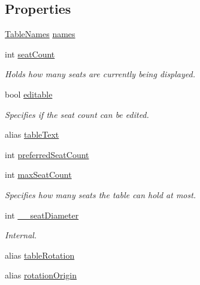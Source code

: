 \subsection*{Properties}
\begin{DoxyCompactItemize}
\item 
\hyperlink{classTableNames}{Table\-Names} \hyperlink{classTable_acdcaaceb37a19b80750e2b5e1c75cc63}{names}
\item 
\hypertarget{classTable_ab401fbfc271b2efc72679916bd055bc6}{int \hyperlink{classTable_ab401fbfc271b2efc72679916bd055bc6}{seat\-Count}}\label{classTable_ab401fbfc271b2efc72679916bd055bc6}

\begin{DoxyCompactList}\small\item\em Holds how many seats are currently being displayed. \end{DoxyCompactList}\item 
\hypertarget{classTable_a3c3a525011e324c966b3753eed579d78}{bool \hyperlink{classTable_a3c3a525011e324c966b3753eed579d78}{editable}}\label{classTable_a3c3a525011e324c966b3753eed579d78}

\begin{DoxyCompactList}\small\item\em Specifies if the seat count can be edited. \end{DoxyCompactList}\item 
alias \hyperlink{classTable_a99ba041de21998ee2f001613334e2b73}{table\-Text}
\item 
int \hyperlink{classTable_adb0d1c7f4d3581f19f370429d6b88241}{preferred\-Seat\-Count}
\item 
\hypertarget{classTable_ab0953083ef1c8e632e10f0828c971b24}{int \hyperlink{classTable_ab0953083ef1c8e632e10f0828c971b24}{max\-Seat\-Count}}\label{classTable_ab0953083ef1c8e632e10f0828c971b24}

\begin{DoxyCompactList}\small\item\em Specifies how many seats the table can hold at most. \end{DoxyCompactList}\item 
\hypertarget{classTable_a4c7d9044fbec7afa25a9f1be38a44a1f}{int \hyperlink{classTable_a4c7d9044fbec7afa25a9f1be38a44a1f}{\-\_\-\-\_\-seat\-Diameter}}\label{classTable_a4c7d9044fbec7afa25a9f1be38a44a1f}

\begin{DoxyCompactList}\small\item\em Internal. \end{DoxyCompactList}\item 
alias \hyperlink{classTable_a0fd0e5c3c8de91f59a26c3e6ec0aa149}{table\-Rotation}
\item 
alias \hyperlink{classTable_acc1414efc33cc8a93d1c36ee2b81ef88}{rotation\-Origin}
\end{DoxyCompactItemize}


